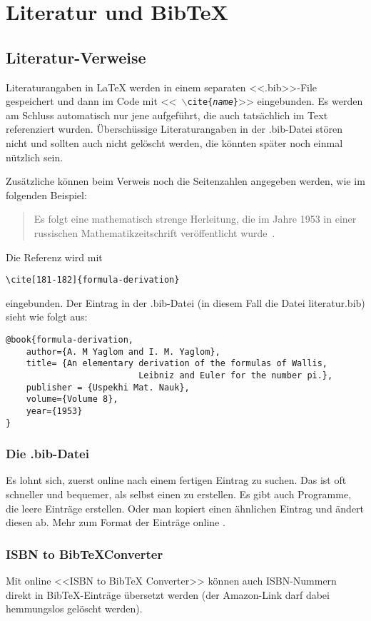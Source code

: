 \chapter{Literatur und Bib\TeX} \label{ch:literatur}
\section{Literatur-Verweise}
Literaturangaben in \LaTeX{} \cite{lamport-latex} werden in einem
separaten <<.bib>>-File gespeichert und dann im Code mit <<{\tt
  $\backslash$cite\{{\em name}\}}>> eingebunden. 
Es werden am Schluss automatisch nur jene aufgeführt, die auch tatsächlich im
Text referenziert wurden. Überschüssige Literaturangaben in der .bib-Datei 
stören nicht und sollten auch nicht gelöscht werden, die könnten später noch
einmal nützlich sein.

Zusätzliche können beim Verweis noch die Seitenzahlen angegeben werden, wie 
im folgenden Beispiel:
\begin{quote}
Es folgt eine mathematisch strenge Herleitung, die im Jahre 1953 in einer russischen Mathematikzeitschrift
	veröffentlicht wurde~\cite[181-182]{formula-derivation}.
\end{quote}
Die Referenz wird mit 
\begin{verbatim}
\cite[181-182]{formula-derivation}
\end{verbatim}
eingebunden. Der Eintrag in der .bib-Datei (in diesem Fall die Datei
literatur.bib) sieht wie folgt aus:

\begin{verbatim}
@book{formula-derivation,
    author={A. M Yaglom and I. M. Yaglom},
    title= {An elementary derivation of the formulas of Wallis, 
	                      Leibniz and Euler for the number pi.},
    publisher = {Uspekhi Mat. Nauk},
    volume={Volume 8},
    year={1953}
}
\end{verbatim}

\subsection{Die .bib-Datei}
Es lohnt sich, zuerst online nach einem fertigen Eintrag zu
suchen. Das ist oft schneller und bequemer, als selbst einen zu
erstellen. Es gibt auch Programme, die
leere Einträge erstellen. Oder man kopiert einen ähnlichen
Eintrag und ändert diesen ab.
Mehr zum Format der Einträge online \cite{bibtex}.


\subsection{ISBN to Bib\TeX{}Converter}
Mit online <<ISBN to Bib\TeX{} Converter>>
\cite{isbn2bibtex} können auch ISBN-Nummern direkt in
Bib\TeX{}-Einträge übersetzt werden (der Amazon-Link darf dabei
hemmungslos gelöscht werden).

